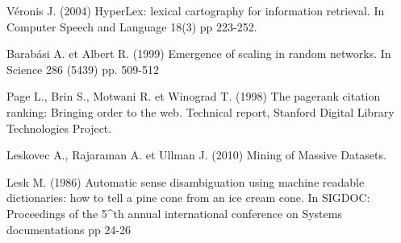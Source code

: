 \begin{thebibliography}{10}
Véronis J. (2004)
HyperLex: lexical cartography for information retrieval.
In Computer Speech and Language 18(3) pp 223-252. \label{bib:veronis} 

Barabási A. et Albert R. (1999)
Emergence of scaling in random networks.
In Science 286 (5439) pp. 509-512 \label{bib:barabasi}

Page L., Brin S., Motwani R. et Winograd T. (1998)
The pagerank citation ranking: Bringing order to the web.
Technical report, Stanford Digital Library Technologies Project.
\label{bib:pagerank}

Leskovec A., Rajaraman A. et Ullman J. (2010)
Mining of Massive Datasets.
\label{bib:linkanalysis}

Lesk M. (1986)
Automatic sense disambiguation using machine readable dictionaries:
how to tell a pine cone from an ice cream cone.
In SIGDOC: Proceedings of the 5^{th} annual international conference
on Systems documentations pp 24-26 
\label{bib:lesk}

\end{thebibliography}
